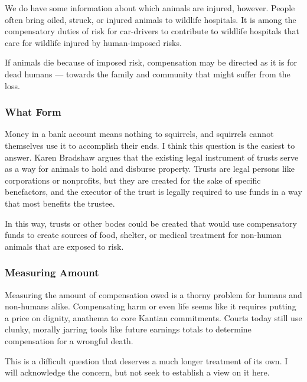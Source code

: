 We do have some information about which animals are injured, however. People
often bring oiled, struck, or injured animals to wildlife hospitals. It is
among the compensatory duties of risk for car-drivers to contribute to wildlife
hospitals that care for wildlife injured by human-imposed risks.

If animals die because of imposed risk, compensation may be directed as it is
for dead humans --- towards the family and community that might suffer from the
loss.

\subsubsection{What Form}

Money in a bank account means nothing to squirrels, and squirrels cannot
themselves use it to accomplish their ends. I think this question is the
easiest to answer. Karen Bradshaw argues that the existing legal instrument of
trusts serve as a way for animals to hold and disburse property. Trusts are
legal persons like corporations or nonprofits, but they are created for the
sake of specific benefactors, and the executor of the trust is legally required
to use funds in a way that most benefits the trustee.

In this way, trusts or other bodes could be created that would use compensatory
funds to create sources of food, shelter, or medical treatment for non-human
animals that are exposed to risk.

\subsubsection{Measuring Amount}

Measuring the amount of compensation owed is a thorny problem for humans and
non-humans alike.  Compensating harm or even life seems like it requires
putting a price on dignity, anathema to core Kantian commitments.  Courts today
still use clunky, morally jarring tools like future earnings totals to
determine compensation for a wrongful death.

This is a difficult question that deserves a much longer treatment of its own.
I will acknowledge the concern, but not seek to establish a view on it here.
